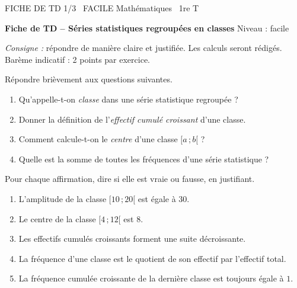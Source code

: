 \documentclass[11pt]{article}
\begin{document}
\begin{tcolorbox}[enhanced,colback=popink,colframe=popink,arc=10pt,boxrule=0pt,left=12pt,right=12pt,top=9pt,bottom=9pt]
{\color{white}\popxbold\small FICHE DE TD 1/3 \textbullet\ FACILE \hfill Mathématiques \textbullet\ 1re T\par}
\end{tcolorbox}
\vspace{4pt}
\textbf{Fiche de TD -- Séries statistiques regroupées en classes} \hfill Niveau : facile

\emph{Consigne :} répondre de manière claire et justifiée. Les calculs seront rédigés. Barème indicatif : 2 points par exercice.

\begin{exercice}
Répondre brièvement aux questions suivantes.
\begin{enumerate}
\item Qu'appelle-t-on \emph{classe} dans une série statistique regroupée ?
\item Donner la définition de l'\emph{effectif cumulé croissant} d'une classe.
\item Comment calcule-t-on le \emph{centre} d'une classe $[a\,;b[$ ?
\item Quelle est la somme de toutes les fréquences d'une série statistique ?
\end{enumerate}
\end{exercice}

\begin{exercice}
Pour chaque affirmation, dire si elle est vraie ou fausse, en justifiant.
\begin{enumerate}
\item L'amplitude de la classe $[10\,;20[$ est égale à $30$.
\item Le centre de la classe $[4\,;12[$ est $8$.
\item Les effectifs cumulés croissants forment une suite décroissante.
\item La fréquence d'une classe est le quotient de son effectif par l'effectif total.
\item La fréquence cumulée croissante de la dernière classe est toujours égale à $1$.
\end{enumerate}
\end{exercice}
\end{document}
